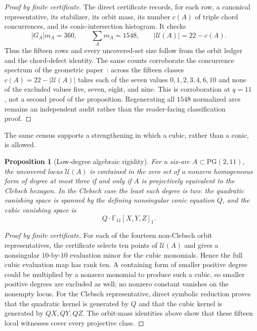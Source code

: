 \documentclass[11pt]{article}
\newtheorem{proposition}[theorem]{Proposition}
\theoremstyle{remark}
\newcommand{\PG}{\mathrm{PG}}
\newcommand{\F}{\mathbb{F}}
\newcommand{\cU}{\mathcal{U}}
\begin{document}
\begin{proof}[Proof by finite certificate]
The direct certificate records, for each row, a canonical representative,
its stabilizer, its orbit mass, its number $c(A)$ of triple chord
concurrences, and its conic-intersection histogram.  It checks
\[
 |G_A|m_A=360,\qquad \sum_A m_A=1548,
 \qquad |\cU(A)|=22-c(A).
\]
Thus the fifteen rows and every uncovered-set size follow from the orbit
ledger and the chord-defect identity.  The same counts corroborate the
concurrence spectrum of the geometric
paper~{\cite[Proposition 3.2]{RuddRigidity2026}}: across the fifteen
classes $c(A)=22-|\cU(A)|$ takes each of the seven values
$0,1,2,3,4,6,10$ and none of the excluded values five, seven, eight, and
nine.  This is corroboration at $q=11$, not a second proof of the
proposition.  Regenerating all $1548$ normalized
arcs remains an independent audit rather than the reader-facing
classification proof.
\end{proof}

The same census supports a strengthening in which a cubic, rather than a
conic, is allowed.

\begin{proposition}[Low-degree algebraic rigidity]
\label{prop:low-degree-rigidity}
For a six-arc $A\subset\PG(2,11)$, the uncovered locus $\cU(A)$ is
contained in the zero set of a nonzero homogeneous form of degree at most
three if and only if $A$ is projectively equivalent to the Clebsch
hexagon. In the Clebsch case the least such degree is two: the quadratic
vanishing space is spanned by the defining nonsingular conic equation $Q$,
and the cubic vanishing space is
\[
 Q\cdot\F_{11}[X,Y,Z]_1.
\]
\end{proposition}

\begin{proof}[Proof by finite certificate]
For each of the fourteen non-Clebsch orbit representatives, the certificate
selects ten points of $\cU(A)$ and gives a nonsingular $10$-by-$10$
evaluation minor for the cubic monomials.  Hence the full cubic evaluation
map has rank ten.  A containing form of smaller positive degree could be
multiplied by a nonzero monomial to produce such a cubic, so smaller positive
degrees are excluded as well; no nonzero constant vanishes on the nonempty
locus.  For the Clebsch representative, direct symbolic reduction proves
that the quadratic kernel is generated by $Q$ and that the cubic kernel is
generated by $QX,QY,QZ$.  The orbit-mass identities above show that these
fifteen local witnesses cover every projective class.
\end{proof}
\end{document}
